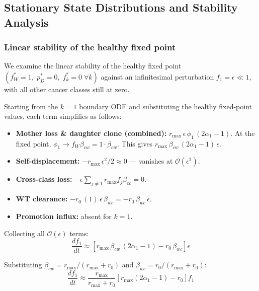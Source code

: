 \documentclass[11pt,a4paper]{article}
\begin{document}
\subsection{Stationary State Distributions and Stability Analysis}

\subsubsection*{Linear stability of the healthy fixed point}

We examine the linear stability of the healthy fixed point $(f_W^* = 1,\; p_D^* = 0,\; f_k^* = 0\;\forall k)$ against an infinitesimal perturbation $f_1 = \epsilon \ll 1$, with all other cancer classes still at zero.

Starting from the $k=1$ boundary ODE and substituting the healthy fixed-point values, each term simplifies as follows:

\begin{itemize}
    \item \textbf{Mother loss \& daughter clone (combined):} $r_{\text{max}}\,\epsilon\,\phi_1\,(2\alpha_1 - 1)$. At the fixed point, $\phi_1 \to f_W \beta_{cw} = 1 \cdot \beta_{cw}$. This gives $r_{\text{max}}\,\beta_{cw}\,(2\alpha_1 - 1)\,\epsilon$.
    \item \textbf{Self-displacement:} $-r_{\text{max}}\,\epsilon^2/2 \approx 0$ --- vanishes at $\mathcal{O}(\epsilon^2)$.
    \item \textbf{Cross-class loss:} $-\epsilon \sum_{j\neq 1} r_{\text{max}} f_j \beta_{cc} = 0$.
    \item \textbf{WT clearance:} $-r_0\,(1)\,\epsilon\,\beta_{wc} = -r_0\,\beta_{wc}\,\epsilon$.
    \item \textbf{Promotion influx:} absent for $k=1$.
\end{itemize}

Collecting all $\mathcal{O}(\epsilon)$ terms:
\begin{equation}
    \frac{df_1}{dt} \approx \left[ r_{\text{max}}\,\beta_{cw}\,(2\alpha_1 - 1) - r_0\,\beta_{wc} \right] \epsilon
\end{equation}

Substituting $\beta_{cw} = r_{\text{max}}/(r_{\text{max}} + r_0)$ and $\beta_{wc} = r_0/(r_{\text{max}} + r_0)$:
\begin{equation}
    \frac{df_1}{dt} \approx \frac{r_{\text{max}}}{r_{\text{max}} + r_0} \left[ r_{\text{max}} (2\alpha_1 - 1) - r_0 \right] f_1
\end{equation}
\end{document}
